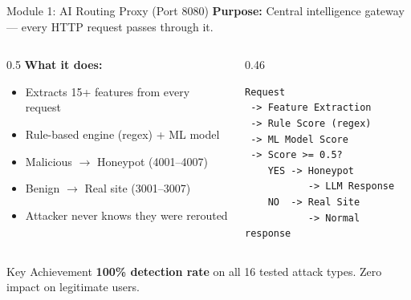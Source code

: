 \documentclass[aspectratio=169,12pt]{beamer}
\begin{document}
\begin{frame}[fragile]{Module 1: AI Routing Proxy (Port 8080)}
  \textbf{\textcolor{dcCyan}{Purpose:}} Central intelligence gateway --- every HTTP request passes through it.

  \vspace{0.3em}
  \begin{columns}[T]
    \begin{column}{0.5\textwidth}
      \textbf{What it does:}
      \begin{itemize}\small
        \item Extracts 15+ features from every request
        \item Rule-based engine (regex) + ML model
        \item \textcolor{dcRed}{Malicious} $\rightarrow$ Honeypot (4001--4007)
        \item \textcolor{dcGreen}{Benign} $\rightarrow$ Real site (3001--3007)
        \item Attacker never knows they were rerouted
      \end{itemize}
    \end{column}
    \begin{column}{0.46\textwidth}
\begin{lstlisting}
Request
 -> Feature Extraction
 -> Rule Score (regex)
 -> ML Model Score
 -> Score >= 0.5?
    YES -> Honeypot
           -> LLM Response
    NO  -> Real Site
           -> Normal response
\end{lstlisting}
    \end{column}
  \end{columns}

  \vspace{0.3em}
  \begin{block}{Key Achievement}
    \textbf{100\% detection rate} on all 16 tested attack types.
    Zero impact on legitimate users.
  \end{block}
\end{frame}
\end{document}
